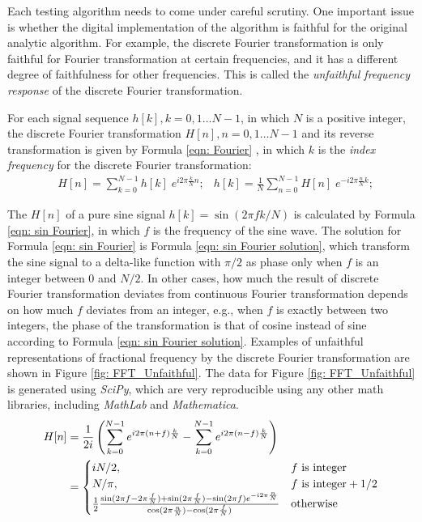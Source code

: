 \documentclass[twoside]{article}
\numberwithin{equation}{section}
\begin{document}
Each testing algorithm needs to come under careful scrutiny.  
One important issue is whether the digital implementation of the algorithm is faithful for the original analytic algorithm.  
For example, the discrete Fourier transformation is only faithful for Fourier transformation at certain frequencies, and it has a different degree of faithfulness for other frequencies.  
This is called the \emph{unfaithful frequency response} of the discrete Fourier transformation.

For each signal sequence $h[k], k = 0, 1 \dots  N-1$, in which $N$ is a positive integer, the discrete Fourier transformation $H[n], n = 0, 1 \dots  N-1$ and its reverse transformation is given by Formula \eqref{eqn: Fourier} \cite{Numerical_Recipes}, in which $k$ is the \emph{index frequency} for the discrete Fourier transformation:
\begin{align}
\label{eqn: Fourier}
& H[n]=\sum_{k=0}^{N-1}h[k] \; e^{i 2\pi \frac{k}{N} n};
& h[k]=\frac{1}{N} \sum_{n=0}^{N-1}H[n] \; e^{-i 2\pi \frac{n}{N} k};
\end{align}

The $H[n]$ of a pure sine signal $h[k] = \sin \left(2\pi f k/N \right)$ is calculated by Formula \eqref{eqn: sin Fourier}, in which $f$ is the frequency of the sine wave.  
The solution for Formula \eqref{eqn: sin Fourier} is Formula \eqref{eqn: sin Fourier solution}, which transform the sine signal to a delta-like function with $\pi/2$ as phase only when $f$ is an integer between $0$ and $N/2$.
In other cases, how much the result of discrete Fourier transformation deviates from continuous Fourier transformation depends on how much $f$ deviates from an integer, e.g., when $f$ is exactly between two integers, the phase of the transformation is that of cosine instead of sine according to Formula \eqref{eqn: sin Fourier solution}.
Examples of unfaithful representations of fractional frequency by the discrete Fourier transformation are shown in Figure \ref{fig: FFT_Unfaithful}. 
The data for Figure \ref{fig: FFT_Unfaithful} is generated using \textit{SciPy}, which are very reproducible using any other math libraries, including \textit{MathLab} and \textit{Mathematica}.
\begin{align}
\centering
\label{eqn: sin Fourier}
H[n] &= \frac{1}{2 i}\left( \sum_{k=0}^{N-1}e^{i 2\pi (n+f)\frac{k}{N}}  - \sum_{k=0}^{N-1} e^{i 2\pi (n-f)\frac{k}{N}} \right) \\
\label{eqn: sin Fourier solution}
&= \begin{cases}
  i N/2, & f \text{ is integer} \\
  N/\pi, & f \text{ is integer} + 1/2 \\
  \frac{1}{2} \frac{\sin(2\pi f - 2\pi \frac{f}{N}) + \sin(2\pi \frac{f}{N})-\sin(2\pi f) e^{-i 2\pi \frac{n}{N}}}{\cos(2\pi \frac{n}{N})-\cos(2\pi \frac{f}{N})} & \text{otherwise}
\end{cases}
\end{align}
\end{document}
